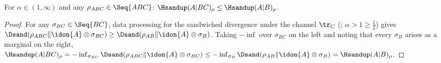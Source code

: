 
\begin{lemma}\label{lem:cond-more}
For $\alpha\in(1,\infty)$ and any $\rho_{ABC}\in\Seq{ABC}$:
$\Hsandup(A|BC)_{\rho}\le\Hsandup(A|B)_{\rho}$.
\end{lemma}

\begin{proof}
For any $\sigma_{BC}\in\Seq{BC}$, data processing for the sandwiched
divergence under the channel $\tr_C$
(\cite[Thm.~4.1, Eq.~(4.82)]{tomamichel2016finite}; $\alpha>1\ge\frac12$)
gives
$\Dsand(\rho_{ABC}\|\idon{A}\otimes\sigma_{BC})
\ge\Dsand(\rho_{AB}\|\idon{A}\otimes\sigma_{B})$. Taking $-\inf$ over
$\sigma_{BC}$ on the left and noting that every $\sigma_B$ arises as a
marginal on the right,
$\Hsandup(A|BC)_{\rho}
=-\inf_{\sigma_{BC}}\Dsand(\rho_{ABC}\|\idon{A}\otimes\sigma_{BC})
\le-\inf_{\sigma_{B}}\Dsand(\rho_{AB}\|\idon{A}\otimes\sigma_{B})
=\Hsandup(A|B)_{\rho}$.
\end{proof}
